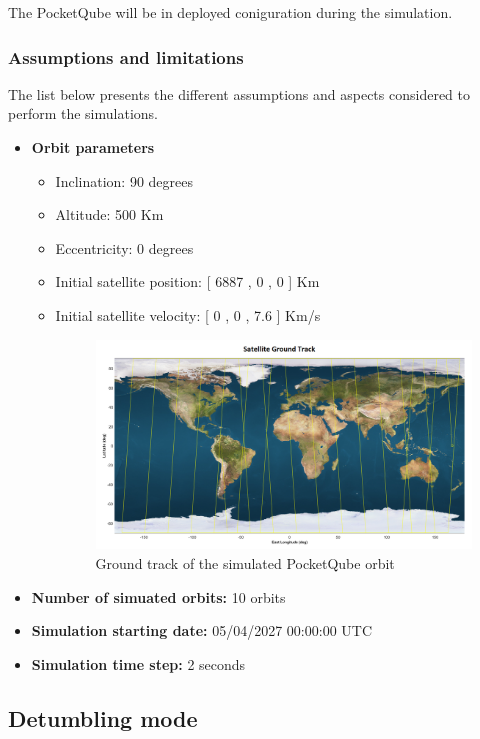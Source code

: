 The PocketQube will be in deployed coniguration during the simulation.


\subsubsection{Assumptions and limitations}
The list below presents the different assumptions and aspects considered to perform the simulations.
\begin{itemize}
    \item \textbf{Orbit parameters}
    \begin{itemize}
        \item Inclination: 90 degrees
        \item Altitude: 500 Km
        \item Eccentricity: 0 degrees
        \item Initial satellite position: [ 6887 , 0 , 0 ] Km
        \item Initial satellite velocity: [ 0 , 0 , 7.6 ] Km/s
        \begin{figure}[H]
            \centering
            \includegraphics[width=0.8\linewidth]{res/img/3_simulation_performance/Sat_groundtrack.png}
            \caption{Ground track of the simulated PocketQube orbit}
            \label{fig:GTrack}
        \end{figure}
    \end{itemize}

    \item \textbf{Number of simuated orbits:} 10 orbits
    \item \textbf{Simulation starting date:} 05/04/2027 00:00:00 UTC
    \item \textbf{Simulation time step:} 2 seconds
\end{itemize}


\subsection{Detumbling mode}